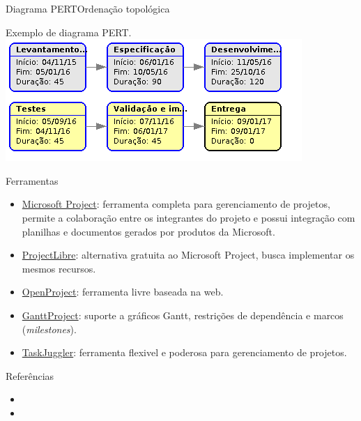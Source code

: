 \begin{frame}{Diagrama PERT}{Ordenação topológica}
\begin{center}
  Exemplo de diagrama PERT.\\\bigskip
  \includegraphics[scale=.4]{img/exemplo-gantt-pert.png}
\end{center}
\end{frame}



\begin{frame}{Ferramentas}
  \begin{itemize}[<+-| alert@+>]
  \item
    \href{https://products.office.com/pt-br/project/project-and-portfolio-management-software}{Microsoft
      Project}: ferramenta completa para gerenciamento de projetos,
    permite a colaboração entre os integrantes do projeto e possui
    integração com planilhas e documentos gerados por produtos da
    Microsoft.
  \item \href{http://www.projectlibre.org/}{ProjectLibre}: alternativa
    gratuita ao Microsoft Project, busca implementar os mesmos
    recursos.
  \item \href{https://www.openproject.org/}{OpenProject}: ferramenta livre baseada 
    na web.
  \item \href{http://www.ganttproject.biz/}{GanttProject}: suporte a
    gráficos Gantt, restrições de dependência e marcos ({\it milestones}).
  \item \href{http://www.taskjuggler.org/}{TaskJuggler}: ferramenta
    flexivel e poderosa para gerenciamento de projetos.
  \end{itemize}
\end{frame}

\begin{frame}{Referências}
  \begin{itemize}
  \item \ianref{}
  \item \ariadneref{}
  \end{itemize}
\end{frame}